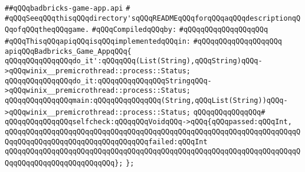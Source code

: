 \label{src/lib/x-kit/tut/badbricks-game/badbricks-game-app.api}
\verb|##qQQqbadbricks-game-app.api|\newline
\verb|#|\newline
\verb|#qQQqSeeqQQqthisqQQqdirectory'sqQQqREADMEqQQqforqQQqaqQQqdescriptionqQQqofqQQqtheqQQqgame.|\newline
\newline
\verb|#qQQqCompiledqQQqby:|\newline
\verb|#qQQqqQQqqQQqqQQqqQQq|\newline
\newline
\verb|#qQQqThisqQQqapiqQQqisqQQqimplementedqQQqin:|\newline
\verb|#qQQqqQQqqQQqqQQqqQQq|\newline
\newline
\verb|apiqQQqBadbricks_Game_AppqQQq{|\newline
\newline
\verb|qQQqqQQqqQQqqQQqdo_it':qQQqqQQq(List(String),qQQqString)qQQq->qQQqwinix__premicrothread::process::Status;|\newline
\verb|qQQqqQQqqQQqqQQqdo_it:qQQqqQQqqQQqqQQqStringqQQq->qQQqwinix__premicrothread::process::Status;|\newline
\verb|qQQqqQQqqQQqqQQqmain:qQQqqQQqqQQqqQQq(String,qQQqList(String))qQQq->qQQqwinix__premicrothread::process::Status;|\newline
\verb|qQQqqQQqqQQqqQQq#|\newline
\verb|qQQqqQQqqQQqqQQqselfcheck:qQQqqQQqVoidqQQq->qQQq{qQQqpassed:qQQqInt,|\newline
\verb|qQQqqQQqqQQqqQQqqQQqqQQqqQQqqQQqqQQqqQQqqQQqqQQqqQQqqQQqqQQqqQQqqQQqqQQqqQQqqQQqqQQqqQQqqQQqqQQqqQQqqQQqfailed:qQQqInt|\newline
\verb|qQQqqQQqqQQqqQQqqQQqqQQqqQQqqQQqqQQqqQQqqQQqqQQqqQQqqQQqqQQqqQQqqQQqqQQqqQQqqQQqqQQqqQQqqQQqqQQq};|\newline
\verb|};|\newline

